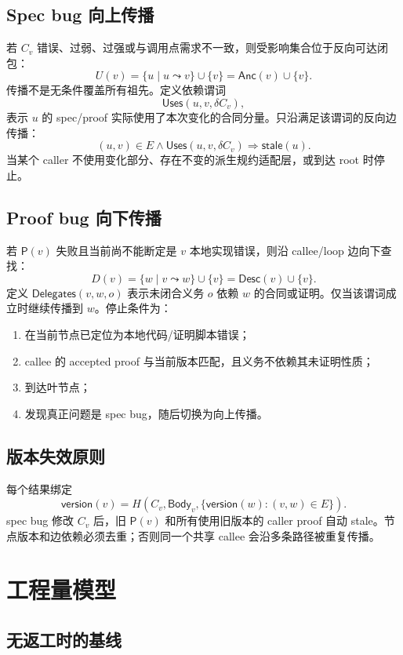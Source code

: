 \documentclass[UTF8,a4paper,11pt]{ctexart}
\newcommand{\ProofOp}{\mathsf{P}}
\newcommand{\Body}{\mathsf{Body}}
\newcommand{\Anc}{\mathsf{Anc}}
\newcommand{\Desc}{\mathsf{Desc}}
\begin{document}
\subsection{Spec bug 向上传播}

若 $C_v$ 错误、过弱、过强或与调用点需求不一致，则受影响集合位于反向可达闭包：
\[
  U(v)=\{u\mid u\leadsto v\}\cup\{v\}=\Anc(v)\cup\{v\}.
\]
传播不是无条件覆盖所有祖先。定义依赖谓词
\[
  \mathsf{Uses}(u,v,\delta C_v),
\]
表示 $u$ 的 spec/proof 实际使用了本次变化的合同分量。只沿满足该谓词的反向边传播：
\[
  (u,v)\in E\land\mathsf{Uses}(u,v,\delta C_v)
  \Longrightarrow \mathsf{stale}(u).
\]
当某个 caller 不使用变化部分、存在不变的派生规约适配层，或到达 root 时停止。

\subsection{Proof bug 向下传播}

若 $\ProofOp(v)$ 失败且当前尚不能断定是 $v$ 本地实现错误，则沿 callee/loop 边向下查找：
\[
  D(v)=\{w\mid v\leadsto w\}\cup\{v\}=\Desc(v)\cup\{v\}.
\]
定义 $\mathsf{Delegates}(v,w,o)$ 表示未闭合义务 $o$ 依赖 $w$ 的合同或证明。仅当该谓词成立时继续传播到 $w$。停止条件为：
\begin{enumerate}
  \item 在当前节点已定位为本地代码/证明脚本错误；
  \item callee 的 accepted proof 与当前版本匹配，且义务不依赖其未证明性质；
  \item 到达叶节点；
  \item 发现真正问题是 spec bug，随后切换为向上传播。
\end{enumerate}

\subsection{版本失效原则}

每个结果绑定
\[
  \mathsf{version}(v)=
  H(C_v,\Body_v,\{\mathsf{version}(w):(v,w)\in E\}).
\]
spec bug 修改 $C_v$ 后，旧 $\ProofOp(v)$ 和所有使用旧版本的 caller proof 自动 stale。节点版本和边依赖必须去重；否则同一个共享 callee 会沿多条路径被重复传播。

\section{工程量模型}

\subsection{无返工时的基线}
\end{document}
